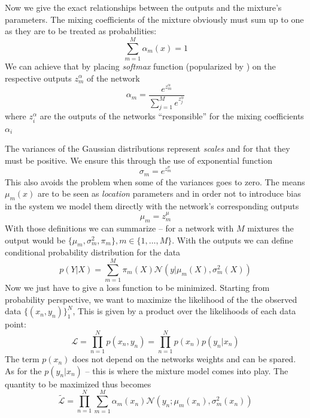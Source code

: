 \documentclass[12pt,a4paper,twoside]{scrartcl}
\numberwithin{equation}{section}
\begin{document}
Now we give the exact relationships between the outputs and the mixture's parameters. The mixing coefficients of the mixture obviously must sum up to one as they are to be treated as probabilities:
\begin{equation}
\sum_{m=1}^M\alpha_m(x)=1
\end{equation}
We can achieve that by placing \emph{softmax} function (popularized by \cite{bridle1990}) on the respective outputs \(z_m^{\alpha} \) of the network 
\begin{equation}
 \alpha_m = \frac{e^{z_m^{\alpha}}}{\sum_{j=1}^M e^{z_j^{\alpha}}}
\end{equation}
where \(z_i^{\alpha}\) are the outputs of the networks ``responsible'' for the mixing coefficients \(\alpha_i\)

The variances of the Gaussian distributions represent \emph{scales} and for that they must be positive. We ensure this through the use of exponential function
\begin{equation}
  \sigma_m = e^{z_m^{\sigma}}
\end{equation}
This also avoids the problem when some of the variances goes to zero. The means \(\mu_m(x)\) are to be seen as \emph{location} parameters and in order not to introduce bias in the system we model them directly with the network's corresponding outputs
\begin{equation}
  \mu_m = z_m^{\mu} 
\end{equation}
With those definitions we can summarize -- for a network with \(M\) mixtures the output would be \(\{\mu_m, \sigma_m^2, \pi_m \}, m\in\{1,\ldots ,M\}\). With the outputs we can define conditional probability distribution for the data
\begin{equation}
  p(Y|X) = \sum_{m=1}^M \pi_m(X)\mathcal{N}(y|\mu_m(X), \sigma_m^2(X))
\end{equation}
Now we just have to give a loss function to be minimized. Starting from probability perspective, we want to maximize the likelihood of the the observed data \(\{(x_n, y_n)\}_1^N\), This is given by a product over the likelihoods of each data point:
\begin{equation}
  \mathcal{L} = \prod_{n=1}^N p(x_n, y_n) = \prod_{n=1}^N p(x_n)p(y_n | x_n)
\end{equation}
The term \(p(x_n)\) does not depend on the networks weights and can be spared. As for the \(p(y_n | x_n)\) -- this is where the mixture model comes into play. The quantity to be maximized thus becomes
\begin{equation}
  \tilde{\mathcal{L}} =  \prod_{n=1}^N \sum_{m=1}^M \alpha_m(x_n)\mathcal{N}(y_n; \mu_m(x_n), \sigma_m^2(x_n))
\end{equation}
\end{document}
